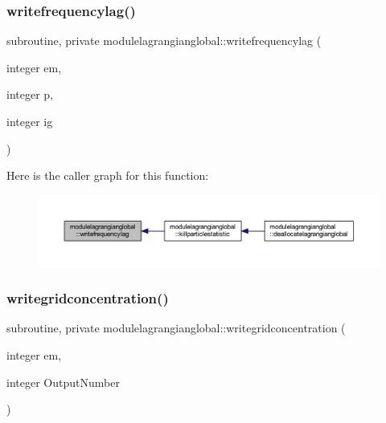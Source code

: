 \subsubsection{\texorpdfstring{writefrequencylag()}{writefrequencylag()}}
{\footnotesize\ttfamily subroutine, private modulelagrangianglobal\+::writefrequencylag (\begin{DoxyParamCaption}\item[{integer}]{em,  }\item[{integer}]{p,  }\item[{integer}]{ig }\end{DoxyParamCaption})\hspace{0.3cm}{\ttfamily [private]}}

Here is the caller graph for this function\+:\nopagebreak
\begin{figure}[H]
\begin{center}
\leavevmode
\includegraphics[width=350pt]{namespacemodulelagrangianglobal_a091fa515c0c76fbe52d2c31ad026151d_icgraph}
\end{center}
\end{figure}
\mbox{\label{namespacemodulelagrangianglobal_a071a32ced5fdfb667319483a8fd208b7}} 
\subsubsection{\texorpdfstring{writegridconcentration()}{writegridconcentration()}}
{\footnotesize\ttfamily subroutine, private modulelagrangianglobal\+::writegridconcentration (\begin{DoxyParamCaption}\item[{integer}]{em,  }\item[{integer}]{Output\+Number }\end{DoxyParamCaption})\hspace{0.3cm}{\ttfamily [private]}}

